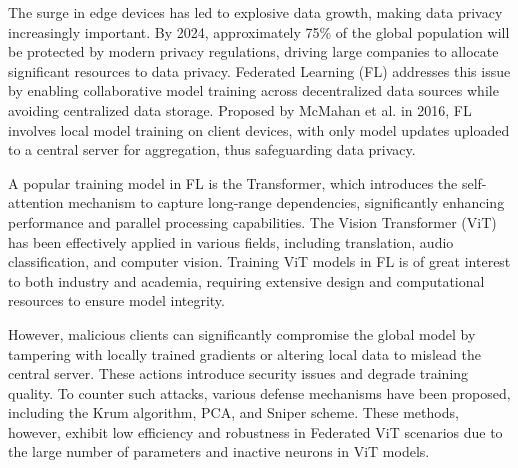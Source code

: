 \documentclass[conference]{IEEEtran}
\begin{document}


The surge in edge devices has led to explosive data growth, making data privacy increasingly important\cite{edgeComputing_explosiveGrowth}. By 2024, approximately 75\% of the global population will be protected by modern privacy regulations, driving large companies to allocate significant resources to data privacy. Federated Learning (FL) addresses this issue by enabling collaborative model training across decentralized data sources while avoiding centralized data storage\cite{useFL2solve}. Proposed by McMahan et al. in 2016, FL involves local model training on client devices, with only model updates uploaded to a central server for aggregation, thus safeguarding data privacy\cite{FLGenesisArticle}.

A popular training model in FL is the Transformer, which introduces the self-attention mechanism to capture long-range dependencies, significantly enhancing performance and parallel processing capabilities\cite{transformer}. The Vision Transformer (ViT) has been effectively applied in various fields, including translation\cite{transformer_translation}, audio classification\cite{transformer_audioClassification}, and computer vision\cite{transformer_vision}. Training ViT models in FL is of great interest to both industry and academia\cite{transformer_gotInterest}, requiring extensive design and computational resources to ensure model integrity.

However, malicious clients can significantly compromise the global model by tampering with locally trained gradients or altering local data to mislead the central server. These actions introduce security issues and degrade training quality. To counter such attacks, various defense mechanisms have been proposed, including the Krum algorithm, PCA, and Sniper scheme\cite{aggregation_Krum, aggregation_MedianTrimmedMean, federatedPCA, aggregation_Sniper}. These methods, however, exhibit low efficiency and robustness in Federated ViT scenarios due to the large number of parameters and inactive neurons in ViT models.
\end{document}
